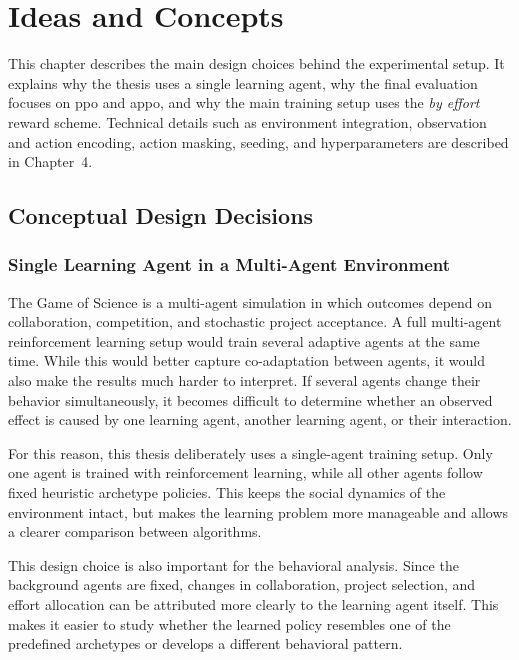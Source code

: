 \documentclass[english,bachelor]{hsluthesis}
\begin{document}
\chapter{Ideas and Concepts}

This chapter describes the main design choices behind the experimental setup. It explains why the thesis uses a single learning agent, why the final evaluation focuses on \gls{ppo} and \gls{appo}, and why the main training setup uses the \textit{by effort} reward scheme. Technical details such as environment integration, observation and action encoding, action masking, seeding, and hyperparameters are described in Chapter~4.

\section{Conceptual Design Decisions}

\subsection{Single Learning Agent in a Multi-Agent Environment}

The Game of Science is a multi-agent simulation in which outcomes depend on collaboration, competition, and stochastic project acceptance. A full multi-agent reinforcement learning setup would train several adaptive agents at the same time. While this would better capture co-adaptation between agents, it would also make the results much harder to interpret. If several agents change their behavior simultaneously, it becomes difficult to determine whether an observed effect is caused by one learning agent, another learning agent, or their interaction.

For this reason, this thesis deliberately uses a single-agent training setup. Only one agent is trained with reinforcement learning, while all other agents follow fixed heuristic archetype policies. This keeps the social dynamics of the environment intact, but makes the learning problem more manageable and allows a clearer comparison between algorithms.

This design choice is also important for the behavioral analysis. Since the background agents are fixed, changes in collaboration, project selection, and effort allocation can be attributed more clearly to the learning agent itself. This makes it easier to study whether the learned policy resembles one of the predefined archetypes or develops a different behavioral pattern.
\end{document}
